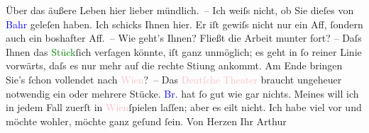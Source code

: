            \pstart
           Über das äußere Leben hier lieber mündlich. –\pend
           \pstart
           Ich weiſs nicht, ob Sie dieſes \label{K_L00990_1v}\label{K_L00990_1h} von \textcolor{blue}{Bahr}{}\ledrightnote{\textcolor{blue}{Hermann Bahr}}
                    geleſen haben. Ich schicks Ihnen hier. \label{LL439-1v}Er
                        iſt gewiſs nicht nur ein Aff, ſondern auch ein boshafter Aff. –\label{LL439-1h}\pend
           \pstart
           Wie geht’s Ihnen? Fließt die Arbeit {\pb}munter fort? –
                    Daſs Ihnen das \textcolor{green}{Stück}{}ſich
                    verſagen könnte, iſt ganz unmöglich; es geht in ſo reiner Linie vorwärts, daſs
                    es nur mehr auf die rechte Sti{\geminationm}ung ankommt. Am Ende
                    bringen Sie’s ſchon vollendet nach \textcolor{pink}{Wien}{}\ledrightnote{\textcolor{pink}{Wien}}? –\pend
           \pstart
           Das \textcolor{pink}{Deutſche Theater}{}\ledrightnote{\textcolor{pink}{Deutsches Theater Berlin}} braucht ungeheuer notwendig
                    ein oder mehrere Stücke. \textcolor{blue}{Br.}{}\ledrightnote{\textcolor{blue}{Otto Brahm}} hat ſo gut wie
                    gar nichts. Meines will ich in jedem Fall zuerſt in \textcolor{pink}{Wien}{}\ledrightnote{\textcolor{pink}{Wien}}{ }ſpielen laſſen; aber es eilt nicht. Ich habe viel vor und möchte
                    wohler, möchte ganz geſund ſein.\pend
           \pstart Von Herzen Ihr \spacefill\mbox{Arthur}\pend{}\endnumbering{}  
      